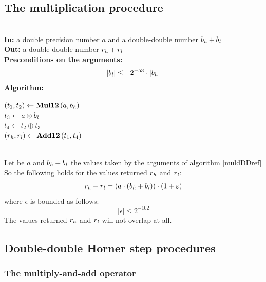 \subsection{The multiplication procedure \MuldDD}
\begin{algorithm}[\MuldDD] \label{muldDDref} ~ \\
{\bf In:} a double precision number $a$ and a double-double number $b_{\mathit{h}} + b_{\mathit{l}}$ \\
{\bf Out:} a double-double number $r_{\mathit{h}} + r_{\mathit{l}}$ \\
{\bf Preconditions on the arguments:}
\begin{eqnarray*}
\left \vert b_{\mathit{l}} \right \vert & \leq & 2^{-53} \cdot \left \vert b_{\mathit{h}} \right \vert 
\end{eqnarray*}
{\bf Algorithm:} \\
\begin{center}
\begin{minipage}[b]{60mm}
$\left( t_1, t_2 \right) \gets \mathbf{Mul12}\left( a, b_{\mathit{h}} \right)$ \\
$t_3 \gets a \otimes b_{\mathit{l}}$ \\
$t_4 \gets t_2 \oplus t_3$ \\
$\left( r_{\mathit{h}}, r_{\mathit{l}} \right) \gets \mathbf{Add12}\left( t_1, t_4 \right)$ \\
\end{minipage}
\end{center}
\end{algorithm}
\begin{theorem} ~ \\
Let be $a$ and $b_{\mathit{h}} + b_{\mathit{l}}$ the values taken by 
the arguments of algorithm \ref{muldDDref} \MuldDD \\
So the following holds for the values returned $r_{\mathit{h}}$ and $r_{\mathit{l}}$:
$$r_{\mathit{h}} + r_{\mathit{l}} = 
\left( a \cdot \left( b_{\mathit{h}} + b_{\mathit{l}} \right)\right) \cdot 
\left(1 + \varepsilon\right)$$
where $\epsilon$ is bounded as follows:
$$\left \vert \epsilon \right \vert \leq 2^{-102}$$
The values returned $r_{\mathit{h}}$ and $r_{\mathit{l}}$ will not overlap at all. 
\end{theorem}

\subsection{Double-double Horner step procedures\label{sec:double-double-horner}}

\subsubsection{The multiply-and-add operator \MulAddDdD}

